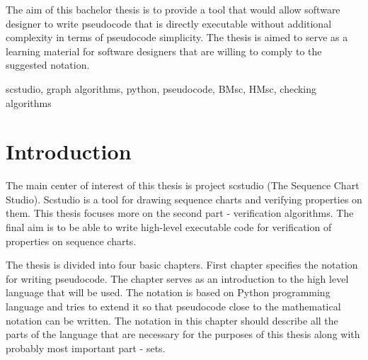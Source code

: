 \documentclass[11pt,oneside]{fithesis2}
\begin{document}
\lstset{language=Python,breaklines,stepnumber=1,numbers=right,numberstyle=\tiny,numbersep=5pt}
\FrontMatter  
\ThesisTitlePage  
 
\begin{ThesisDeclaration}  
\DeclarationText  
\AdvisorName  
\end{ThesisDeclaration}  
 
\begin{ThesisThanks}  
\end{ThesisThanks}  

\begin{ThesisAbstract}  
The aim of this bachelor thesis is to provide a tool that would allow software designer to write pseudocode that is directly executable without additional complexity in terms of pseudocode simplicity. The thesis is aimed to serve as a learning material for software designers that are willing to comply to the suggested notation.


\end{ThesisAbstract}  

\begin{ThesisKeyWords}  
scstudio, graph algorithms, python, pseudocode, BMsc, HMsc, checking algorithms
\end{ThesisKeyWords}  
 
\MainMatter  
\tableofcontents          %
 
\chapter{Introduction}    %
The main center of interest of this thesis is project scstudio (The Sequence Chart Studio)\cite{scstudio,scstudio2}. Scstudio is a tool for drawing sequence charts and verifying properties on them. This thesis focuses more on the second part - verification algorithms. The final aim is to be able to write high-level executable code for verification of properties on sequence charts.

The thesis is divided into four basic chapters. First chapter specifies the notation for writing pseudocode. The chapter serves as an introduction to the high level language that will be used. The notation is based on Python\cite{python,python2} programming language and tries to extend it so that pseudocode close to the mathematical notation can be written. The notation in this chapter should describe all the parts of the language that are necessary for the purposes of this thesis along with probably most important part - sets.
\end{document}
